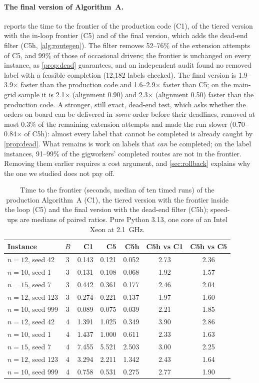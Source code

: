 \documentclass[11pt]{article}
\theoremstyle{definition}
\theoremstyle{remark}
\begin{document}
\paragraph{The final version of Algorithm~A.}  reports the time
to the frontier of the production code (C1), of the tiered version with the
in-loop frontier (C5) and of the final version, which adds the dead-end filter
(C5h, \cref{alg:routegen}). The filter removes 52--76\% of the extension
attempts of C5, and 99\% of those of occasional drivers; the frontier is
unchanged on every instance, as \cref{prop:dead} guarantees, and an
independent audit found no removed label with a feasible completion (12,182
labels checked). The final version is 1.9--3.9$\times$ faster than the
production code and 1.6--2.9$\times$ faster than C5; on the main-grid sample
it is 2.1$\times$ (alignment 0.90) and 2.3$\times$ (alignment 0.50) faster than
the production code. A stronger, still exact, dead-end test, which asks
whether the orders on board can be delivered in \emph{some} order before their
deadlines, removed at most 0.3\% of the remaining extension attempts and made
the run slower (0.70--0.84$\times$ of C5h): almost every label that cannot be
completed is already caught by \cref{prop:dead}. What remains is work on
labels that \emph{can} be completed; on the label instances, 91--99\% of the
gigworkers' completed routes are not in the frontier. Removing them earlier
requires a cost argument, and \cref{sec:rollback} explains why the one we
studied does not pay off.

\begin{table}[!htbp]
\centering
\caption{Time to the frontier (seconds, median of ten timed runs) of the production Algorithm~A (C1), the tiered version with the frontier inside the loop (C5) and the final version with the dead-end filter (C5h); speed-ups are medians of paired ratios. Pure Python 3.13, one core of an Intel Xeon at 2.1~GHz.}
\label{tab:final}
\small
\setlength{\tabcolsep}{4pt}
\begin{tabular}{lcrrrcc}
\toprule
Instance & $B$ & C1 & C5 & C5h & C5h vs C1 & C5h vs C5\\
\midrule
$n=12$, seed 42 & 3 & 0.143 & 0.121 & 0.052 & 2.73 & 2.36\\
$n=10$, seed 1 & 3 & 0.131 & 0.108 & 0.068 & 1.92 & 1.57\\
$n=15$, seed 7 & 3 & 0.442 & 0.361 & 0.177 & 2.46 & 2.04\\
$n=12$, seed 123 & 3 & 0.274 & 0.221 & 0.137 & 1.97 & 1.60\\
$n=10$, seed 999 & 3 & 0.089 & 0.075 & 0.039 & 2.21 & 1.85\\
\midrule
$n=12$, seed 42 & 4 & 1.391 & 1.025 & 0.349 & 3.90 & 2.86\\
$n=10$, seed 1 & 4 & 1.437 & 1.000 & 0.611 & 2.33 & 1.63\\
$n=15$, seed 7 & 4 & 7.455 & 5.521 & 2.503 & 3.00 & 2.25\\
$n=12$, seed 123 & 4 & 3.294 & 2.211 & 1.342 & 2.43 & 1.64\\
$n=10$, seed 999 & 4 & 0.758 & 0.531 & 0.275 & 2.77 & 1.90\\
\bottomrule
\end{tabular}
\end{table}
\end{document}
